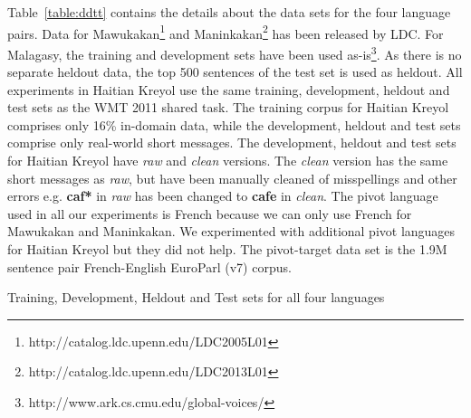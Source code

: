 \documentclass[11pt]{article}
\begin{document}
 Table~\ref{table:ddtt} contains the details about the data sets for the four language pairs. Data for Mawukakan\footnote{http://catalog.ldc.upenn.edu/LDC2005L01} and Maninkakan\footnote{http://catalog.ldc.upenn.edu/LDC2013L01} has been released by LDC. For Malagasy, the training and development sets have been used as-is\footnote{http://www.ark.cs.cmu.edu/global-voices/}. As there is no separate heldout data, the top 500 sentences of the test set is used as heldout. All experiments in Haitian Kreyol use the same training, development, heldout and test sets as the WMT 2011 shared task. The training corpus for Haitian Kreyol comprises only 16\% in-domain data, while the development, heldout and test sets comprise only real-world short messages. The development, heldout and test sets for Haitian Kreyol have \emph{raw} and \emph{clean} versions. The \emph{clean} version has the same short messages as \emph{raw}, but have been manually cleaned of misspellings and other errors e.g. \textbf{caf*} in \emph{raw} has been changed to \textbf{cafe} in \emph{clean}. The pivot language used in all our experiments is French because we can only use French for Mawukakan and Maninkakan. We experimented with additional pivot languages for Haitian Kreyol but they did not help. The pivot-target data set is the 1.9M sentence pair French-English EuroParl (v7) corpus.
	\begin{table}
		\small
		\centering
		
		\caption{Training, Development, Heldout and Test sets for all four languages}
		\label{table:ddtt}
	\end{table}
\end{document}
